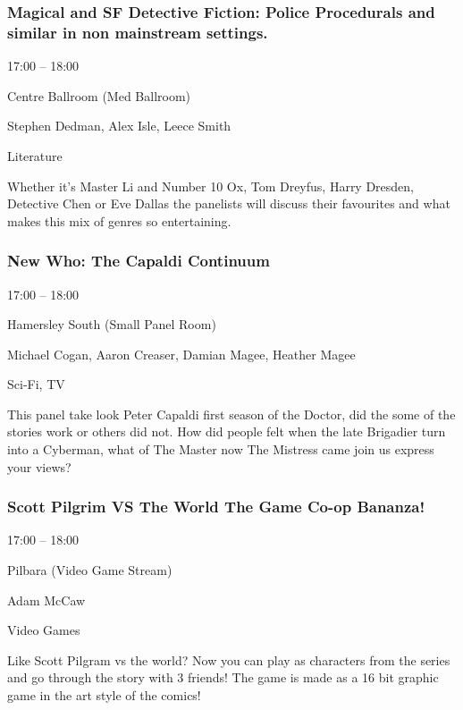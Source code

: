 \documentclass{scrreprt}
\begin{document}
\begin{multicols}{2}
\subsubsection*{Magical and SF Detective Fiction: Police Procedurals and similar in non mainstream settings.}\begin{description}
\setlength{\itemsep}{0pt}
\setlength{\parsep}{0pt}
\setlength{\parskip}{0pt}
\item[Time:]{17:00 -- 18:00}
\item[Venue:]{Centre Ballroom (Med Ballroom)}
\item[People:]{Stephen Dedman, Alex Isle, Leece Smith}
\item[Tags:]{Literature}\end{description}
Whether it's Master Li and Number 10 Ox, Tom Dreyfus, Harry Dresden, Detective Chen or Eve Dallas the panelists will discuss their favourites and what makes this mix of genres so entertaining.
\subsubsection*{New Who: The Capaldi Continuum}\begin{description}
\setlength{\itemsep}{0pt}
\setlength{\parsep}{0pt}
\setlength{\parskip}{0pt}
\item[Time:]{17:00 -- 18:00}
\item[Venue:]{Hamersley South (Small Panel Room)}
\item[People:]{Michael Cogan, Aaron Creaser, Damian Magee, Heather Magee}
\item[Tags:]{Sci-Fi, TV}\end{description}
This panel take look Peter Capaldi first season of the Doctor, did the some of the stories work or others did not. How did people felt when the late Brigadier turn into a Cyberman, what of The Master now The Mistress came join us express your views?
\subsubsection*{Scott Pilgrim VS The World The Game Co-op Bananza!}\begin{description}
\setlength{\itemsep}{0pt}
\setlength{\parsep}{0pt}
\setlength{\parskip}{0pt}
\item[Time:]{17:00 -- 18:00}
\item[Venue:]{Pilbara (Video Game Stream)}
\item[People:]{Adam McCaw}
\item[Tags:]{Video Games}\end{description}
Like Scott Pilgram vs the world? Now you can play as characters from the series and go through the story with 3 friends! The game is made as a 16 bit graphic game in the art style of the comics!

\end{multicols}
\end{document}
